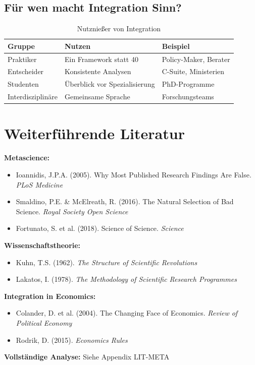 \documentclass[12pt,a4paper]{article}
\begin{document}
\subsection{Für wen macht Integration Sinn?}

\begin{table}[htbp]
\centering
\caption{Nutznießer von Integration}
\renewcommand{\arraystretch}{1.3}
\begin{tabular}{@{}lll@{}}
\toprule
\textbf{Gruppe} & \textbf{Nutzen} & \textbf{Beispiel} \\
\midrule
Praktiker & Ein Framework statt 40 & Policy-Maker, Berater \\
Entscheider & Konsistente Analysen & C-Suite, Ministerien \\
Studenten & Überblick vor Spezialisierung & PhD-Programme \\
Interdisziplinäre & Gemeinsame Sprache & Forschungsteams \\
\bottomrule
\end{tabular}
\end{table}

\section{Weiterführende Literatur}

\begin{tcolorbox}[colback=blue!5!white, colframe=blue!75!black,
    title=\textbf{Kernlektüre für das Integrations-Argument}]

\textbf{Metascience:}
\begin{itemize}[nosep]
\item Ioannidis, J.P.A. (2005). Why Most Published Research Findings Are False. \textit{PLoS Medicine}
\item Smaldino, P.E. \& McElreath, R. (2016). The Natural Selection of Bad Science. \textit{Royal Society Open Science}
\item Fortunato, S. et al. (2018). Science of Science. \textit{Science}
\end{itemize}

\textbf{Wissenschaftstheorie:}
\begin{itemize}[nosep]
\item Kuhn, T.S. (1962). \textit{The Structure of Scientific Revolutions}
\item Lakatos, I. (1978). \textit{The Methodology of Scientific Research Programmes}
\end{itemize}

\textbf{Integration in Economics:}
\begin{itemize}[nosep]
\item Colander, D. et al. (2004). The Changing Face of Economics. \textit{Review of Political Economy}
\item Rodrik, D. (2015). \textit{Economics Rules}
\end{itemize}

\textbf{Vollständige Analyse:} Siehe Appendix LIT-META
\end{tcolorbox}
\end{document}

